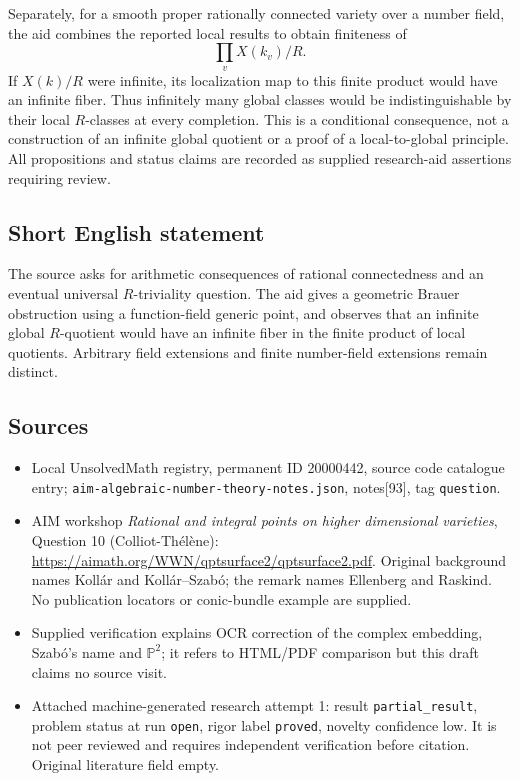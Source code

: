\documentclass[11pt]{article}
\newcommand{\PP}{\mathbb{P}}
\begin{document}
Separately, for a smooth proper rationally connected variety over a number field, the aid combines the reported local results to obtain finiteness of
\[\prod_vX(k_v)/R.\]
If $X(k)/R$ were infinite, its localization map to this finite product would have an infinite fiber. Thus infinitely many global classes would be indistinguishable by their local $R$-classes at every completion. This is a conditional consequence, not a construction of an infinite global quotient or a proof of a local-to-global principle. All propositions and status claims are recorded as supplied research-aid assertions requiring review.
\subsection{Short English statement}
The source asks for arithmetic consequences of rational connectedness and an eventual universal $R$-triviality question. The aid gives a geometric Brauer obstruction using a function-field generic point, and observes that an infinite global $R$-quotient would have an infinite fiber in the finite product of local quotients. Arbitrary field extensions and finite number-field extensions remain distinct.
\subsection{Sources}
\begin{itemize}
\item Local UnsolvedMath registry, permanent ID 20000442, source code catalogue entry; \texttt{aim-algebraic-number-theory-notes.json}, notes[93], tag \texttt{question}.
\item AIM workshop \emph{Rational and integral points on higher dimensional varieties}, Question 10 (Colliot-Thélène): \url{https://aimath.org/WWN/qptsurface2/qptsurface2.pdf}. Original background names Kollár and Kollár--Szabó; the remark names Ellenberg and Raskind. No publication locators or conic-bundle example are supplied.
\item Supplied verification explains OCR correction of the complex embedding, Szabó's name and $\PP^2$; it refers to HTML/PDF comparison but this draft claims no source visit.
\item Attached machine-generated research attempt 1: result \texttt{partial\_result}, problem status at run \texttt{open}, rigor label \texttt{proved}, novelty confidence low. It is not peer reviewed and requires independent verification before citation. Original literature field empty.
\end{itemize}
\end{document}
